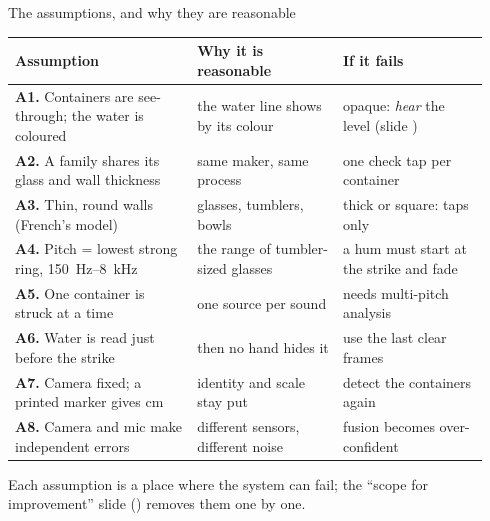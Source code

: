 \begin{frame}{The assumptions, and why they are reasonable}
    \label{sl:assumptions}
    \scriptsize
    \renewcommand{\arraystretch}{1.1}
    \begin{tabular}{@{}>{\raggedright\arraybackslash}p{0.355\linewidth} >{\raggedright\arraybackslash}p{0.29\linewidth} >{\raggedright\arraybackslash}p{0.29\linewidth}@{}}
        \toprule
        \textbf{Assumption} & \textbf{Why it is reasonable} & \textbf{If it fails} \\
        \midrule
        \textbf{A1.} Containers are see-through; the water is coloured & the water line shows by its colour & opaque: \emph{hear} the level (slide \pageref{sl:general}) \\
        \textbf{A2.} A family shares its glass and wall thickness & same maker, same process & one check tap per container \\
        \textbf{A3.} Thin, round walls (French's model) \cite{french1983} & glasses, tumblers, bowls & thick or square: taps only \\
        \textbf{A4.} Pitch = lowest strong ring, 150~Hz--8~kHz & the range of tumbler-sized glasses & a hum must start at the strike and fade \\
        \textbf{A5.} One container is struck at a time & one source per sound & needs multi-pitch analysis \\
        \textbf{A6.} Water is read just before the strike & then no hand hides it & use the last clear frames \\
        \textbf{A7.} Camera fixed; a printed marker gives cm & identity and scale stay put & detect the containers again \\
        \textbf{A8.} Camera and mic make independent errors & different sensors, different noise & fusion becomes over-confident \\
        \bottomrule
    \end{tabular}
    \vspace{1mm}

    {\scriptsize Each assumption is a place where the system can fail; the ``scope for improvement'' slide (\pageref{sl:improve}) removes them one by one.\par}
\end{frame}

